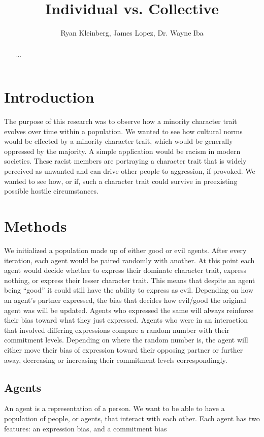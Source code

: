 \documentclass[]{article}
\title{Individual vs. Collective}
\author{Ryan Kleinberg, James Lopez, Dr. Wayne Iba}
\begin{document}
\maketitle


\begin{abstract}
	...
\end{abstract}

\section{Introduction}
The purpose of this research was to observe how a minority character trait evolves over time within a population. We wanted to see how cultural norms would be effected by a minority character trait, which would be generally oppressed by the majority. A simple application would be racism in modern societies. These racist members are portraying a character trait that is widely perceived as unwanted and can drive other people to aggression, if provoked. We wanted to see how, or if, such a character trait could survive in preexisting possible hostile circumstances.
\section{Methods}%
We initialized a population made up of either good or evil agents. After every iteration, each agent would be paired randomly with another. At this point each agent would decide whether to express their dominate character trait, express nothing, or express their lesser character trait. This means that despite an agent being “good” it could still have the ability to express as evil. Depending on how an agent’s partner expressed, the bias that decides how evil/good the original agent was will be updated. Agents who expressed the same will always reinforce their bias toward what they just expressed. Agents who were in an interaction that involved differing expressions compare a random number with their commitment levels.
Depending on where the random number is, the agent will either move their bias of expression toward their opposing partner or further away, decreasing or increasing their commitment levels correspondingly.

\subsection{Agents}
An agent is a representation of a person. We want to be able to have a population of people, or agents, that interact with each other. Each agent has two features: an expression bias, and a commitment bias
\end{document}
